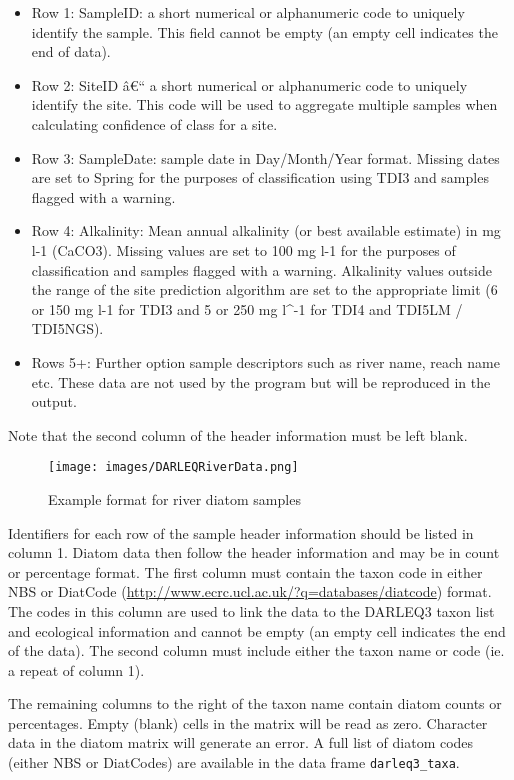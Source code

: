 \documentclass[]{article}
\begin{document}
\begin{itemize}
\item
  Row 1: SampleID: a short numerical or alphanumeric code to uniquely
  identify the sample. This field cannot be empty (an empty cell
  indicates the end of data).
\item
  Row 2: SiteID â€`` a short numerical or alphanumeric code to uniquely
  identify the site. This code will be used to aggregate multiple
  samples when calculating confidence of class for a site.
\item
  Row 3: SampleDate: sample date in Day/Month/Year format. Missing dates
  are set to Spring for the purposes of classification using TDI3 and
  samples flagged with a warning.
\item
  Row 4: Alkalinity: Mean annual alkalinity (or best available estimate)
  in mg l-1 (CaCO3). Missing values are set to 100 mg l-1 for the
  purposes of classification and samples flagged with a warning.
  Alkalinity values outside the range of the site prediction algorithm
  are set to the appropriate limit (6 or 150 mg l-1 for TDI3 and 5 or
  250 mg l\^{}-1 for TDI4 and TDI5LM / TDI5NGS).
\item
  Rows 5+: Further option sample descriptors such as river name, reach
  name etc. These data are not used by the program but will be
  reproduced in the output.
\end{itemize}

Note that the second column of the header information must be left
blank.

\begin{figure}
\centering
\texttt{[image: images/DARLEQRiverData.png]}
\caption{Example format for river diatom samples}
\end{figure}

Identifiers for each row of the sample header information should be
listed in column 1. Diatom data then follow the header information and
may be in count or percentage format. The first column must contain the
taxon code in either NBS or DiatCode
(\url{http://www.ecrc.ucl.ac.uk/?q=databases/diatcode}) format. The
codes in this column are used to link the data to the DARLEQ3 taxon list
and ecological information and cannot be empty (an empty cell indicates
the end of the data). The second column must include either the taxon
name or code (ie. a repeat of column 1).

The remaining columns to the right of the taxon name contain diatom
counts or percentages. Empty (blank) cells in the matrix will be read as
zero. Character data in the diatom matrix will generate an error. A full
list of diatom codes (either NBS or DiatCodes) are available in the data
frame \texttt{darleq3\_taxa}.
\end{document}
